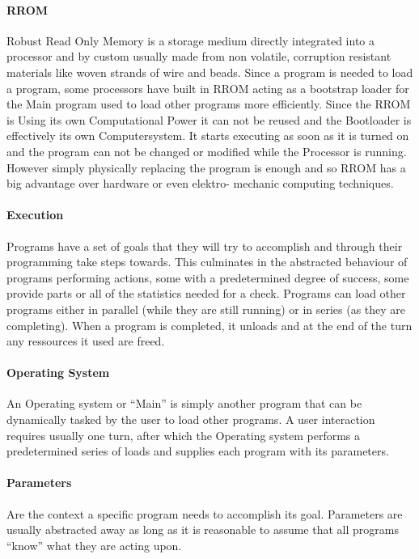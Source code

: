 \paragraph{RROM}
Robust Read Only Memory is a storage medium directly integrated into a processor and by custom usually made from non
volatile, corruption resistant materials like woven strands of wire and beads.
Since a program is needed to load a program, some processors have built in RROM acting as a bootstrap loader for the
Main program used to load other programs more efficiently.
Since the RROM is Using its own Computational Power it can not be reused and the Bootloader is effectively its own
Computersystem.
It starts executing as soon as it is turned on and the program can not be changed or modified while the Processor is
running.
However simply physically replacing the program is enough and so RROM has a big advantage over hardware or even elektro-
mechanic computing techniques.

\paragraph{Execution}
Programs have a set of goals that they will try to accomplish and through their programming take steps towards.
This culminates in the abstracted behaviour of programs performing actions, some with a predetermined degree of success,
some provide parts or all of the statistics needed for a check.
Programs can load other programs either in parallel (while they are still running) or in series
(as they are completing).
When a program is completed, it unloads and at the end of the turn any ressources it used are freed.

\paragraph{Operating System}
An Operating system or ``Main'' is simply another program that can be dynamically tasked by the user to load other
programs.
A user interaction requires usually one turn, after which the Operating system performs a predetermined series of loads
and supplies each program with its parameters.

\paragraph{Parameters}
Are the context a specific program needs to accomplish its goal.
Parameters are usually abstracted away as long as it is reasonable to assume that all programs ``know'' what they
are acting upon.

